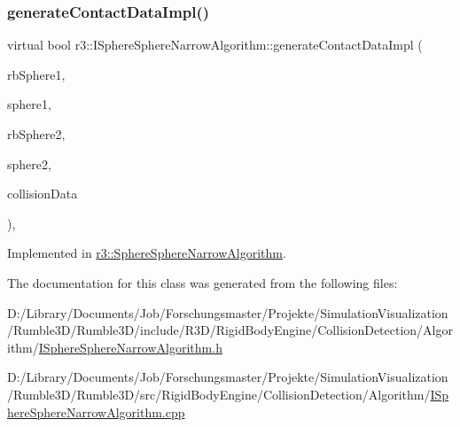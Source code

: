 \mbox{\label{classr3_1_1_i_sphere_sphere_narrow_algorithm_a9e616d04c7ee379d973ec81ea0067cc3}} 
\subsubsection{\texorpdfstring{generate\+Contact\+Data\+Impl()}{generateContactDataImpl()}}
{\footnotesize\ttfamily virtual bool r3\+::\+I\+Sphere\+Sphere\+Narrow\+Algorithm\+::generate\+Contact\+Data\+Impl (\begin{DoxyParamCaption}\item[{\mbox{\hyperlink{classr3_1_1_rigid_body}{Rigid\+Body}} $\ast$}]{rb\+Sphere1,  }\item[{\mbox{\hyperlink{classr3_1_1_collision_sphere}{Collision\+Sphere}} $\ast$}]{sphere1,  }\item[{\mbox{\hyperlink{classr3_1_1_rigid_body}{Rigid\+Body}} $\ast$}]{rb\+Sphere2,  }\item[{\mbox{\hyperlink{classr3_1_1_collision_sphere}{Collision\+Sphere}} $\ast$}]{sphere2,  }\item[{\mbox{\hyperlink{classr3_1_1_collision_data}{Collision\+Data}} \&}]{collision\+Data }\end{DoxyParamCaption})\hspace{0.3cm}{\ttfamily [protected]}, {}}



Implemented in \mbox{\hyperlink{classr3_1_1_sphere_sphere_narrow_algorithm_a3559238de013b2fb8f3786e365e2ace7}{r3\+::\+Sphere\+Sphere\+Narrow\+Algorithm}}.



The documentation for this class was generated from the following files\+:\begin{DoxyCompactItemize}
\item 
D\+:/\+Library/\+Documents/\+Job/\+Forschungsmaster/\+Projekte/\+Simulation\+Visualization/\+Rumble3\+D/\+Rumble3\+D/include/\+R3\+D/\+Rigid\+Body\+Engine/\+Collision\+Detection/\+Algorithm/\mbox{\hyperlink{_i_sphere_sphere_narrow_algorithm_8h}{I\+Sphere\+Sphere\+Narrow\+Algorithm.\+h}}\item 
D\+:/\+Library/\+Documents/\+Job/\+Forschungsmaster/\+Projekte/\+Simulation\+Visualization/\+Rumble3\+D/\+Rumble3\+D/src/\+Rigid\+Body\+Engine/\+Collision\+Detection/\+Algorithm/\mbox{\hyperlink{_i_sphere_sphere_narrow_algorithm_8cpp}{I\+Sphere\+Sphere\+Narrow\+Algorithm.\+cpp}}\end{DoxyCompactItemize}
